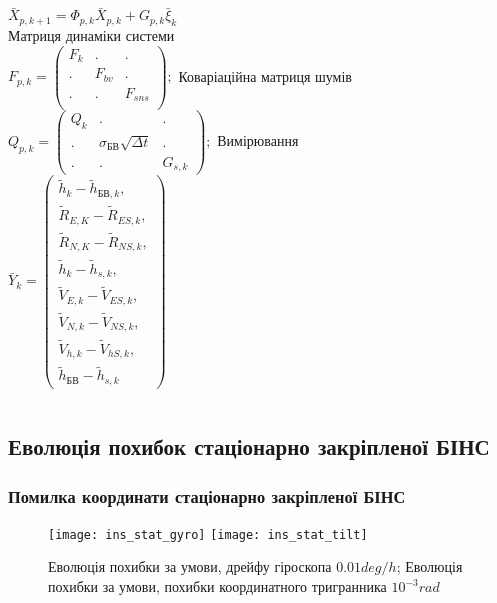 \documentclass[ucs,compress]{beamer}    %
\begin{document}
\begin{frame}[shrink=5]
\begin{columns}[t]
\begin{column}{5cm}
$\bar{X}_{p,k+1} =\Phi_{p,k} \bar{X}_{p,k} +G_{p,k} \bar{\xi }_{k}$ \\
Матриця динаміки системи\\
$ F_{p,k} =\left(\begin{array}{ccc} 
{F_{k} } & {.} & {.} \\
{.} & {F_{bv}} & {.} \\
{.} & {.} & {F_{sns}} \\
\end{array}\right);$
Коваріаційна матриця шумів\\
$Q_{p,k} =\left(\begin{array}{ccc} 
{Q_{k} } & {.} & {.} \\ 
{.} & {\sigma_{\text{БВ}} \sqrt{\Delta t}} & {.} \\ 
{.} & {.} & {G_{s,k} } \end{array}\right);$
Вимірювання\\
$\bar{Y}_{k} = 
\left(\begin{array}{l}
{\tilde{h}_{k} -\tilde{h}_{\text{БВ},k},}\\
{\tilde{R}_{E,K} -\tilde{R}_{ES,k},}\\
{\tilde{R}_{N,K} -\tilde{R}_{NS,k},}\\
{\tilde{h}_{k} -\tilde{h}_{s,k},}\\
{\tilde{V}_{E,k} -\tilde{V}_{ES,k},}\\
{\tilde{V}_{N,k} -\tilde{V}_{NS,k},}\\
{\tilde{V}_{h,k} -\tilde{V}_{hS,k},}\\
{\tilde{h}_{\text{БВ}} -\tilde{h}_{s,k}}
\end{array} \right) $
\end{column}
\end{columns}
\end{frame}

\subsection{Еволюція похибок стаціонарно закріпленої БІНС} 
\begin{frame}
\frametitle{Помилка координати стаціонарно закріпленої БІНС}

\begin{figure}[l]
\texttt{[image: ins\_stat\_gyro]}
\texttt{[image: ins\_stat\_tilt]}
\caption{\tiny Еволюція похибки за умови, дрейфу гіроскопа $0.01 deg/h$; Еволюція похибки за умови, похибки координатного тригранника $10^{-3} rad$}
\label{fig:sdins2}
\end{figure}
\end{frame}
\end{document}
